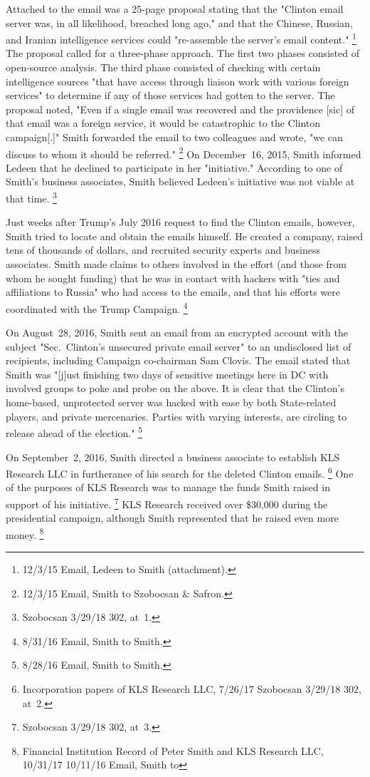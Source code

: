 Attached to the email was a 25-page proposal stating that the "Clinton email server was, in all likelihood, breached long ago," and that the Chinese, Russian, and Iranian intelligence services could "re-assemble the server's email content."%
\footnote{12/3/15 Email, Ledeen to Smith (attachment).}
The proposal called for a three-phase approach.
The first two phases consisted of open-source analysis.
The third phase consisted of checking with certain intelligence sources "that have access through liaison work with various foreign services" to determine if any of those services had gotten to the server.
The proposal noted, "Even if a single email was recovered and the providence [sic] of that email was a foreign service, it would be catastrophic to the Clinton campaign[.]"
Smith forwarded the email to two colleagues and wrote, "we can discuss to whom it should be referred."%
\footnote{12/3/15 Email, Smith to Szobocsan \& Safron.}
On December~16, 2015, Smith informed Ledeen that he declined to participate in her "initiative."
According to one of Smith's business associates, Smith believed Ledeen's initiative was not viable at that time.%
\footnote{Szobocsan 3/29/18 302, at~1.}

Just weeks after Trump's July 2016 request to find the Clinton emails, however, Smith tried to locate and obtain the emails himself.
He created a company, raised tens of thousands of dollars, and recruited security experts and business associates.
Smith made claims to others involved in the effort (and those from whom he sought funding) that he was in contact with hackers with "ties and affiliations to Russia" who had access to the emails, and that his efforts were coordinated with the Trump Campaign.%
\footnote{8/31/16 Email, Smith to Smith.}

On August~28, 2016, Smith sent an email from an encrypted account with the subject "Sec.~Clinton's unsecured private email server" to an undisclosed list of recipients, including Campaign co-chairman Sam Clovis.
The email stated that Smith was "[j]ust finishing two days of sensitive meetings here in DC with involved groups to poke and probe on the above.
It is clear that the Clinton's home-based, unprotected server was hacked with ease by both State-related players, and private mercenaries.
Parties with varying interests, are circling to release ahead of the election."%
\footnote{8/28/16 Email, Smith to Smith.}

On September~2, 2016, Smith directed a business associate to establish KLS Research LLC in furtherance of his search for the deleted Clinton emails.%
\footnote{Incorporation papers of KLS Research LLC, 7/26/17 
Szobocsan 3/29/18 302, at~2.}
One of the purposes of KLS Research was to manage the funds Smith raised in support of his initiative.%
\footnote{Szobocsan 3/29/18 302, at~3.}
KLS Research received over \$30,000 during the presidential campaign, although Smith represented that he raised even more money.%
\footnote{Financial Institution Record of Peter Smith and KLS Research LLC, 10/31/17  10/11/16 Email, Smith to }

